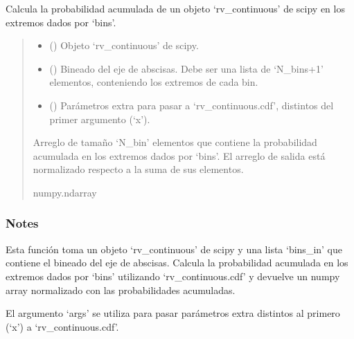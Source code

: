 \documentclass[letterpaper,10pt,english]{sphinxmanual}
\begin{document}
\begin{fulllineitems}
\label{\detokenize{myutils:myutils.stats.bin_rv_cont}}
\pysigstartsignatures
{}
\pysigstopsignatures
\sphinxAtStartPar
Calcula la probabilidad acumulada de un objeto ‘rv\_continuous’ de scipy en los extremos dados por ‘bins’.
\begin{quote}\begin{description}
\begin{itemize}
\item {} 
\sphinxAtStartPar
{} () \textendash{} Objeto ‘rv\_continuous’ de scipy.

\item {} 
\sphinxAtStartPar
{} () \textendash{} Bineado del eje de abscisas. Debe ser una lista de ‘N\_bins+1’ elementos, conteniendo los extremos de cada bin.

\item {} 
\sphinxAtStartPar
{} (\sphinxstyleliteralemphasis{\sphinxupquote{, }}) \textendash{} Parámetros extra para pasar a ‘rv\_continuous.cdf’, distintos del primer argumento (‘x’).

\end{itemize}

\sphinxAtStartPar
Arreglo de tamaño ‘N\_bin’ elementos que contiene la probabilidad acumulada en los extremos dados por ‘bins’.
El arreglo de salida está normalizado respecto a la suma de sus elementos.

\sphinxAtStartPar
numpy.ndarray

\end{description}\end{quote}
\subsubsection*{Notes}

\sphinxAtStartPar
Esta función toma un objeto ‘rv\_continuous’ de scipy y una lista ‘bins\_in’ que contiene el bineado del eje de abscisas.
Calcula la probabilidad acumulada en los extremos dados por ‘bins’ utilizando ‘rv\_continuous.cdf’ y devuelve un numpy array
normalizado con las probabilidades acumuladas.

\sphinxAtStartPar
El argumento ‘args’ se utiliza para pasar parámetros extra distintos al primero (‘x’) a ‘rv\_continuous.cdf’.

\end{fulllineitems}
\end{document}
